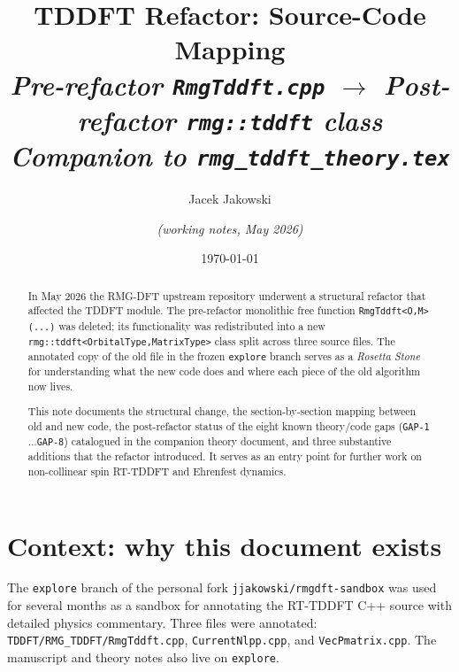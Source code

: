 \documentclass[11pt,letterpaper]{article}
\begin{document}
\title{\Large\bfseries TDDFT Refactor: Source-Code Mapping\\[4pt]
\normalsize\textit{Pre-refactor \texttt{RmgTddft.cpp} $\to$
Post-refactor \texttt{rmg::tddft} class}\\[2pt]
\normalsize\textit{Companion to \texttt{rmg\_tddft\_theory.tex}}}
\author{Jacek Jakowski \and \textit{(working notes, May 2026)}}
\date{\today}
\maketitle

\begin{abstract}
In May 2026 the RMG-DFT upstream repository underwent a structural refactor
that affected the TDDFT module.  The pre-refactor monolithic free function
\texttt{RmgTddft<O,M>(...)} was deleted; its functionality was redistributed
into a new \texttt{rmg::tddft<OrbitalType,MatrixType>} class split across
three source files.  The annotated copy of the old file in the frozen
\texttt{explore} branch serves as a \emph{Rosetta Stone} for understanding
what the new code does and where each piece of the old algorithm now lives.

This note documents the structural change, the section-by-section mapping
between old and new code, the post-refactor status of the eight known
theory/code gaps (\texttt{GAP-1}$\dots$\texttt{GAP-8}) catalogued in the
companion theory document, and three substantive additions that the
refactor introduced.  It serves as an entry point for further work on
non-collinear spin RT-TDDFT and Ehrenfest dynamics.
\end{abstract}

\tableofcontents
\bigskip

\section{Context: why this document exists}
\label{sec:context}

The \texttt{explore} branch of the personal fork
\texttt{jjakowski/rmgdft-sandbox} was used for several months as a sandbox
for annotating the RT-TDDFT C++ source with detailed physics commentary.
Three files were annotated:
\texttt{TDDFT/RMG\_TDDFT/RmgTddft.cpp}, \texttt{CurrentNlpp.cpp}, and
\texttt{VecPmatrix.cpp}.  The manuscript and theory notes also live on
\texttt{explore}.
\end{document}
